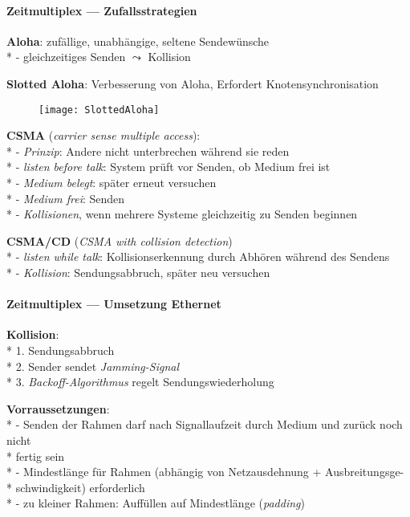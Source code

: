 \paragraph{Zeitmultiplex --- Zufallsstrategien}
\begin{items}
  \item \textbf{Aloha}: zufällige, unabhängige, seltene Sendewünsche \\*
    - gleichzeitiges Senden \( \leadsto \) Kollision
  \item \textbf{Slotted Aloha}: Verbesserung von Aloha, Erfordert Knotensynchronisation
    \begin{figure}[H]\centering\label{SlottedAloha}\texttt{[image: SlottedAloha]}\end{figure}
    \medskip
  \item \textbf{CSMA} (\emph{carrier sense multiple access}): \\*
    - \emph{Prinzip}: Andere nicht unterbrechen während sie reden \\*
    - \emph{listen before talk}: System prüft vor Senden, ob Medium frei ist \\*
    - \emph{Medium belegt}: später erneut versuchen \\*
    - \emph{Medium frei}: Senden \\*
    - \emph{Kollisionen}, wenn mehrere Systeme gleichzeitig zu Senden beginnen
  \item \textbf{CSMA/CD} (\emph{CSMA with collision detection}) \\*
    - \emph{listen while talk}: Kollisionserkennung durch Abhören während des Sendens \\*
    - \emph{Kollision}: Sendungsabbruch, später neu versuchen
\end{items}

\paragraph{Zeitmultiplex --- Umsetzung Ethernet}
\begin{items}
  \item \textbf{Kollision}: \\*
    1. Sendungsabbruch \\*
    2. Sender sendet \emph{Jamming-Signal} \\*
    3. \emph{Backoff-Algorithmus} regelt Sendungswiederholung
  \item \textbf{Vorraussetzungen}: \\*
    - Senden der Rahmen darf nach Signallaufzeit durch Medium und zurück noch nicht \\* \phantom{-} \phantom{\( \cdot \)} fertig sein \\*
    - Mindestlänge für Rahmen (abhängig von Netzausdehnung + Ausbreitungsge- \\* \phantom{-} \phantom{\( \cdot \)} schwindigkeit) erforderlich \\*
    - zu kleiner Rahmen: Auffüllen auf Mindestlänge (\emph{padding})
\end{items}

